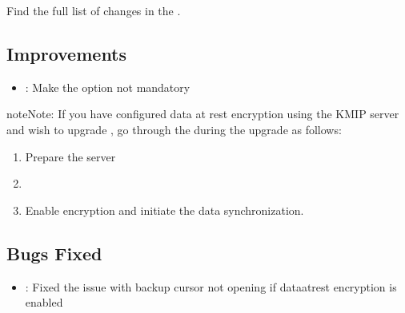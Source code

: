 \documentclass[letterpaper,10pt,english]{sphinxmanual}
\begin{document}
\sphinxAtStartPar
Find the full list of changes in the .


\subsection{Improvements}
\label{\detokenize{release_notes/4.4.16-16:improvements}}\begin{itemize}
\item {} 
\sphinxAtStartPar
{}: Make the  option not mandatory

\end{itemize}

\begin{sphinxadmonition}{note}{Note:}
\sphinxAtStartPar
If you have configured data at rest encryption using the KMIP server and wish to upgrade , go through the  during the upgrade as follows:
\begin{enumerate}
%
\item {} 
\sphinxAtStartPar
Prepare the server

\item {} 
\sphinxAtStartPar
{\hyperref[\detokenize{install/upgrade-from-mongodb:minor-upgrade}]{}}

\item {} 
\sphinxAtStartPar
Enable encryption and initiate the data synchronization.

\end{enumerate}
\end{sphinxadmonition}


\subsection{Bugs Fixed}
\label{\detokenize{release_notes/4.4.16-16:bugs-fixed}}\begin{itemize}
\item {} 
\sphinxAtStartPar
{}: Fixed the issue with backup cursor not opening if data\sphinxhyphen{}at\sphinxhyphen{}rest encryption is enabled

\end{itemize}
\end{document}
